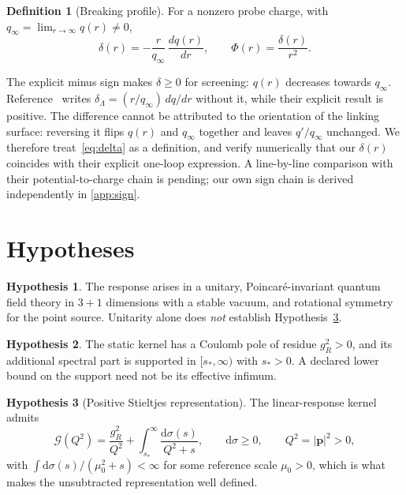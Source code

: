 \documentclass[11pt]{article}
\theoremstyle{definition}
\newtheorem{definition}[theorem]{Definition}
\newtheorem{hypothesis}{Hypothesis}
\theoremstyle{remark}
\newcommand{\Gcal}{\mathcal{G}}
\newcommand{\dsig}{\mathrm{d}\sigma}
\begin{document}
\begin{definition}[Breaking profile]
For a nonzero probe charge, with $q_{\infty}=\lim_{r\to\infty}q(r)\neq0$,
\begin{equation}
\delta(r)=-\frac{r}{q_{\infty}}\,\frac{dq(r)}{dr},
\qquad
\Phi(r)=\frac{\delta(r)}{r^{2}}.
\label{eq:delta}
\end{equation}
\end{definition}
The explicit minus sign makes $\delta\ge0$ for screening: $q(r)$ decreases
towards $q_{\infty}$. Reference~\cite{basile_golmohammadi_2025} writes
$\delta_{\Lambda}=(r/q_{\infty})\,dq/dr$ without it, while their explicit
result is positive. The difference cannot be attributed to the orientation of
the linking surface: reversing it flips $q(r)$ and $q_{\infty}$ together and
leaves $q'/q_{\infty}$ unchanged. We therefore treat~\eqref{eq:delta} as a
definition, and verify numerically that our $\delta(r)$ coincides with their
explicit one-loop expression. A line-by-line comparison with their
potential-to-charge chain is pending; our own sign chain is derived
independently in \cref{app:sign}.

\section{Hypotheses}

\begin{hypothesis}\label{hyp:qft}
The response arises in a unitary, Poincar\'e-invariant quantum field theory in
$3+1$ dimensions with a stable vacuum, and rotational symmetry for the point
source. Unitarity alone does \emph{not} establish
Hypothesis~\ref{hyp:stieltjes}.
\end{hypothesis}

\begin{hypothesis}\label{hyp:gap}
The static kernel has a Coulomb pole of residue $g_{R}^{2}>0$, and its
additional spectral part is supported in $[s_{*},\infty)$ with $s_{*}>0$. A
declared lower bound on the support need not be its effective infimum.
\end{hypothesis}

\begin{hypothesis}[Positive Stieltjes representation]\label{hyp:stieltjes}
The linear-response kernel admits
\begin{equation}
\Gcal(Q^{2})=\frac{g_{R}^{2}}{Q^{2}}
+\int_{s_{*}}^{\infty}\frac{\dsig(s)}{Q^{2}+s},
\qquad \dsig\ge0,\qquad Q^{2}=|\mathbf{p}|^{2}>0,
\label{eq:H3}
\end{equation}
with $\int\dsig(s)/(\mu_{0}^{2}+s)<\infty$ for some reference scale
$\mu_{0}>0$, which is what makes the unsubtracted representation well defined.
\end{hypothesis}
\end{document}
